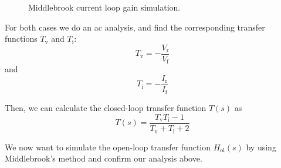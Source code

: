 \documentclass[
  a4paper,
  DIV=11,
  numbers=noendperiod]{scrartcl}
\begin{document}
\begin{figure}[H]


\caption{\label{fig-middlebrook-current}Middlebrook current loop gain
simulation.}

\end{figure}%

For both cases we do an ac analysis, and find the corresponding transfer
functions \(T_\mathrm{v}\) and \(T_\mathrm{i}\): \[
T_\mathrm{v} = -\frac{V_\mathrm{r}}{V_\mathrm{f}}
\] and \[
T_\mathrm{i} = -\frac{I_\mathrm{r}}{I_\mathrm{f}}
\]

Then, we can calculate the closed-loop transfer function \(T(s)\) as \[
T(s) = \frac{T_\mathrm{v} T_\mathrm{i} - 1}{T_\mathrm{v} + T_\mathrm{i} + 2}
\]

We now want to simulate the open-loop transfer function
\(H_\mathrm{ol}(s)\) by using Middlebrook's method and confirm our
analysis above.
\end{document}
